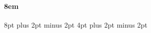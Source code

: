 \titlespacing\paragraph{8em}{8pt plus 2pt minus 2pt}%
{4pt plus 2pt minus 2pt}

% 
% 
% 
% 
% 
% 
% 
%     
%     
% 
